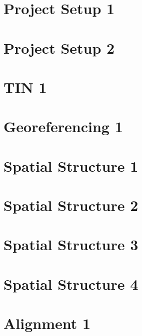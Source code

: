 \documentclass{scrartcl}
\begin{document}
\section{Project Setup 1}
\label{sec:project_setup_1}
\clearpage

\section{Project Setup 2}
\label{sec:project_setup_2}
\clearpage


\section{TIN 1}
\label{sec:tin_1}
\clearpage

\section{Georeferencing 1}
\label{sec:georeferencing_1}
\clearpage



\section{Spatial Structure 1}
\label{sec:spatial_1}
\clearpage

\section{Spatial Structure 2}
\label{sec:spatial_2}
\clearpage

\section{Spatial Structure 3}
\label{sec:spatial_3}
\clearpage

\section{Spatial Structure 4}
\label{sec:spatial_4}
\clearpage


\section{Alignment 1}
\label{sec:alignment_12d_1}
\clearpage
\end{document}
